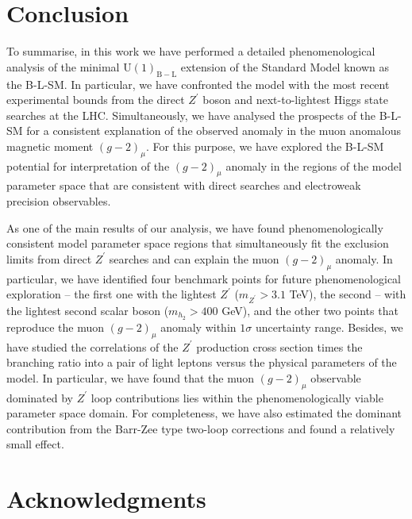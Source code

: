 \documentclass[a4paper,11pt]{article}
\renewcommand{\[}{\left[}
\renewcommand{\]}{\right]}
\newcommand{\U}[1]{\mathrm{U}(1)_{\mathrm{#1}}}			%
\begin{document}
\section{Conclusion}
\label{sec:Conclusions}

To summarise, in this work we have performed a detailed phenomenological analysis of the
minimal $\U{B-L}$ extension of the Standard Model known as the B-L-SM. In particular, 
we have confronted the model with the most recent experimental bounds from the direct 
$Z^\prime$ boson and next-to-lightest Higgs state searches at the LHC. Simultaneously, 
we have analysed the prospects of the B-L-SM for a consistent explanation 
of the observed anomaly in the muon anomalous magnetic moment $(g-2)_{\mu}$. 
For this purpose, we have explored the B-L-SM potential for interpretation of the $(g-2)_{\mu}$ anomaly in the regions of the model parameter space that 
are consistent with direct searches and electroweak precision observables.

As one of the main results of our analysis, we have found phenomenologically consistent model parameter space regions that simultaneously fit the exclusion limits from direct $Z^\prime$ searches and can explain the muon $(g-2)_{\mu}$ anomaly. In particular, we have identified four benchmark points for future phenomenological exploration -- the first one with the lightest $Z^\prime$ ($m_{Z^\prime}>3.1$ TeV), the second -- with the lightest second scalar boson ($m_{h_2}>400$ GeV), and the other two points that reproduce the muon $(g-2)_{\mu}$ anomaly within $1\sigma$ uncertainty range. Besides, we have studied the correlations of the $Z^\prime$ production cross section times the branching ratio into a pair of light leptons versus the physical parameters of the model. In particular, we have found that the muon $(g-2)_{\mu}$ observable dominated by $Z^\prime$ loop contributions lies within the phenomenologically viable parameter space domain. For completeness, we have also estimated the dominant contribution from the Barr-Zee type two-loop corrections and found a relatively small effect.

\section*{Acknowledgments}
\end{document}
